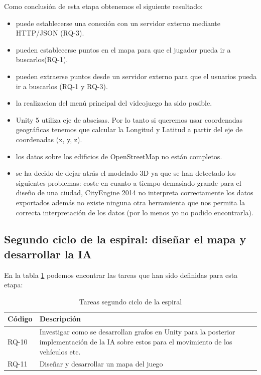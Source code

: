 Como conclusión de esta etapa obtenemos el siguiente resultado:
\begin{itemize}
	\item puede establecerse una conexión con un servidor externo mediante HTTP/JSON (RQ-3). 
	\item pueden establecerse puntos en el mapa para que el jugador pueda ir a buscarlos(RQ-1). 
	\item pueden extraerse puntos desde un servidor externo para que el usuarios pueda ir a buscarlos (RQ-1 y RQ-3).
	\item la realizacion del menú principal del videojuego ha sido posible.
	\item Unity 5 utiliza eje de abscisas. Por lo tanto si queremos usar coordenadas geográficas tenemos que calcular la Longitud y Latitud a partir del eje de coordenadas (x, y, z).
	\item los datos sobre los edificios de OpenStreetMap no están completos.
	\item se ha decido de dejar atrás el modelado 3D ya que se han detectado los siguientes problemas: coste en cuanto a tiempo demasiado grande para el diseño de una ciudad, CityEngine 2014 no interpreta correctamente los datos exportados además no existe ninguna otra herramienta que nos permita la correcta interpretación de los datos (por lo menos yo no podido encontrarla).
\end{itemize}

\subsection{Segundo ciclo de la espiral: diseñar el mapa y desarrollar la IA}

En la tabla \ref{tabla:requisitosEtapa2} podemos encontrar las tareas que han sido definidas para esta etapa:

\begin{table}[H]
\begin{center}
\begin{tabular}{|p{1.5cm}| p{10.5cm}|}
\hline 
Código & Descripción \\
\hline \hline
RQ-10 & Investigar como se desarrollan grafos en Unity para la posterior implementación de la IA sobre estos para el movimiento de los vehículos etc. \\ \hline
RQ-11 & Diseñar y desarrollar un mapa del juego\\ \hline
\end{tabular}
\caption{Tareas segundo ciclo de la espiral}
\label{tabla:requisitosEtapa2}
\end{center}
\end{table}

